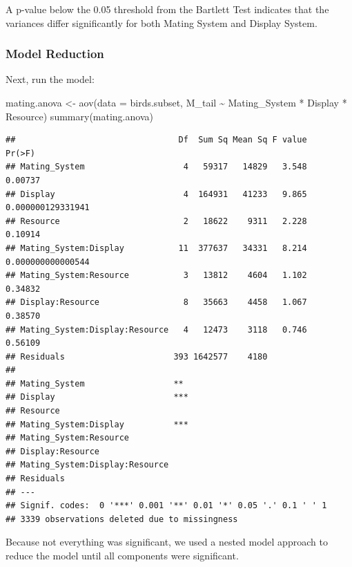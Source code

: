 \documentclass[
  12pt,
]{article}
\newenvironment{Shaded}{\begin{snugshade}}{\end{snugshade}}
\newcommand{\AttributeTok}[1]{\textcolor[rgb]{0.77,0.63,0.00}{#1}}
\newcommand{\FunctionTok}[1]{\textcolor[rgb]{0.00,0.00,0.00}{#1}}
\newcommand{\NormalTok}[1]{#1}
\newcommand{\OtherTok}[1]{\textcolor[rgb]{0.56,0.35,0.01}{#1}}
\newcommand{\SpecialCharTok}[1]{\textcolor[rgb]{0.00,0.00,0.00}{#1}}
\begin{document}
A p-value below the 0.05 threshold from the Bartlett Test indicates that
the variances differ significantly for both Mating System and Display
System.

\hypertarget{model-reduction}{%
\subsubsection{Model Reduction}\label{model-reduction}}

Next, run the model:

\begin{Shaded}
\begin{Highlighting}[]
\NormalTok{mating.anova }\OtherTok{\textless{}{-}} \FunctionTok{aov}\NormalTok{(}\AttributeTok{data =}\NormalTok{ birds.subset, M\_tail }\SpecialCharTok{\textasciitilde{}}\NormalTok{ Mating\_System }\SpecialCharTok{*}\NormalTok{ Display }\SpecialCharTok{*}\NormalTok{ Resource)}
\FunctionTok{summary}\NormalTok{(mating.anova)}
\end{Highlighting}
\end{Shaded}

\begin{verbatim}
##                                 Df  Sum Sq Mean Sq F value            Pr(>F)
## Mating_System                    4   59317   14829   3.548           0.00737
## Display                          4  164931   41233   9.865 0.000000129331941
## Resource                         2   18622    9311   2.228           0.10914
## Mating_System:Display           11  377637   34331   8.214 0.000000000000544
## Mating_System:Resource           3   13812    4604   1.102           0.34832
## Display:Resource                 8   35663    4458   1.067           0.38570
## Mating_System:Display:Resource   4   12473    3118   0.746           0.56109
## Residuals                      393 1642577    4180                          
##                                   
## Mating_System                  ** 
## Display                        ***
## Resource                          
## Mating_System:Display          ***
## Mating_System:Resource            
## Display:Resource                  
## Mating_System:Display:Resource    
## Residuals                         
## ---
## Signif. codes:  0 '***' 0.001 '**' 0.01 '*' 0.05 '.' 0.1 ' ' 1
## 3339 observations deleted due to missingness
\end{verbatim}

Because not everything was significant, we used a nested model approach
to reduce the model until all components were significant.
\end{document}
